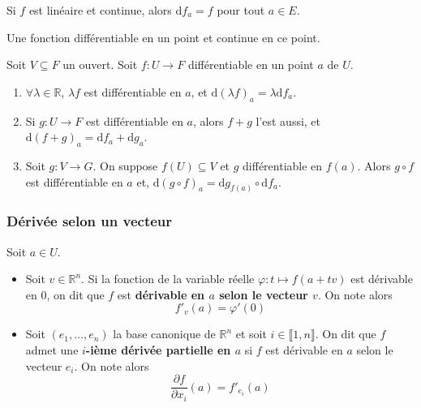   \begin{example}
    Si $f$ est linéaire et continue, alors $\mathrm{d}f_a = f$ pour tout $a \in E$.
  \end{example}

  \begin{proposition}
    Une fonction différentiable en un point et continue en ce point.
  \end{proposition}

  \begin{proposition}
    Soit $V \subseteq F$ un ouvert. Soit $f : U \rightarrow F$ différentiable en un point $a$ de $U$.
    \begin{enumerate}[label={\bfseries(\roman*)}]
      \item $\forall \lambda \in \mathbb{R}$, $\lambda f$ est différentiable en $a$, et $\mathrm{d}(\lambda f)_a = \lambda \mathrm{d}f_a$.
      \item Si $g : U \rightarrow F$ est différentiable en $a$, alors $f+g$ l'est aussi, et $\mathrm{d}(f+g)_a = \mathrm{d}f_a + \mathrm{d}g_a$.
      \item Soit $g : V \rightarrow G$. On suppose $f(U) \subseteq V$ et $g$ différentiable en $f(a)$. Alors $g \circ f$ est différentiable en $a$ et, $\mathrm{d}(g \circ f)_a = \mathrm{d}g_{f(a)} \circ \mathrm{d}f_a$.
    \end{enumerate}
  \end{proposition}

  \subsubsection{Dérivée selon un vecteur}


  \begin{definition}
    Soit $a \in U$.
    \begin{itemize}
      \item Soit $v \in \mathbb{R}^n$. Si la fonction de la variable réelle $\varphi : t \mapsto f(a+tv)$ est dérivable en $0$, on dit que $f$ est \textbf{dérivable en $a$ selon le vecteur $v$}. On note alors
      \[ f'_v(a) = \varphi'(0) \]
      \item Soit $(e_1, \dots, e_n)$ la base canonique de $\mathbb{R}^n$ et soit $i \in \llbracket 1, n \rrbracket$. On dit que $f$ admet une \textbf{$i$-ième dérivée partielle en $a$} si $f$ est dérivable en $a$ selon le vecteur $e_i$. On note alors
      \[ \frac{\partial f}{\partial x_i}(a) = f'_{e_i}(a) \]
    \end{itemize}
  \end{definition}

